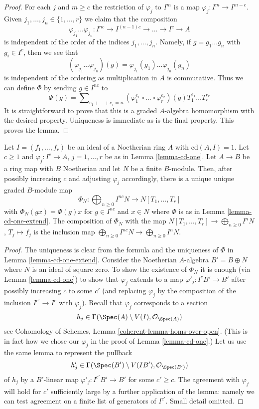 \begin{proof}
For each $j$ and $m \geq c$ the restriction of $\varphi_j$ to
$I^m$ is a map $\varphi_j : I^m \to I^{m - c}$.
Given $j_1, \ldots, j_n \in \{1, \ldots, r\}$ we claim that the
composition
$$
\varphi_{j_1} \ldots \varphi_{j_n} :
I^{nc} \to I^{(n - 1)c} \to \ldots \to I^c \to A
$$
is independent of the order of the indices $j_1, \ldots, j_n$.
Namely, if $g = g_1 \ldots g_n$ with $g_i \in I^c$, then
we see that
$$
(\varphi_{j_1} \ldots \varphi_{j_n})(g) =
\varphi_{j_1}(g_1) \ldots \varphi_{j_n}(g_n)
$$
is independent of the ordering as multiplication in $A$ is commutative.
Thus we can define $\Phi$ by sending $g \in I^{nc}$ to
$$
\Phi(g) = \sum\nolimits_{e_1 + \ldots + e_r = n}
(\varphi_1^{e_1} \circ \ldots \circ \varphi_r^{e_r})(g)
T_1^{e_1} \ldots T_r^{e_r}
$$
It is straightforward to prove that this is a graded $A$-algebra
homomorphism with the desired property. Uniqueness is immediate
as is the final property. This proves the lemma.
\end{proof}

\begin{lemma}
\label{lemma-cd-one-extend-to-module}
Let $I = (f_1, \ldots, f_r)$ be an ideal of a Noetherian ring $A$
with $\text{cd}(A, I) = 1$. Let $c \geq 1$ and $\varphi_j : I^c \to A$,
$j = 1, \ldots, r$ be as in Lemma \ref{lemma-cd-one}.
Let $A \to B$ be a ring map with $B$ Noetherian and let $N$ be
a finite $B$-module. Then, after possibly increasing $c$
and adjusting $\varphi_j$ accordingly, there is a unique
unique graded $B$-module map
$$
\Phi_N : \bigoplus\nolimits_{n \geq 0} I^{nc}N \to N[T_1, \ldots, T_r]
$$
with $\Phi_N(g x) = \Phi(g) x$ for $g \in I^{nc}$ and $x \in N$
where $\Phi$ is as in Lemma \ref{lemma-cd-one-extend}.
The composition of $\Phi_N$ with the map
$N[T_1, \ldots, T_r] \to \bigoplus_{n \geq 0} I^nN$,
$T_j \mapsto f_j$ is the inclusion map
$\bigoplus_{n \geq 0} I^{nc}N \to \bigoplus_{n \geq 0} I^nN$.
\end{lemma}

\begin{proof}
The uniqueness is clear from the formula and the uniqueness of $\Phi$ in
Lemma \ref{lemma-cd-one-extend}. Consider the Noetherian $A$-algebra
$B' = B \oplus N$ where $N$ is an ideal of square zero. To show
the existence of $\Phi_N$ it is enough
(via Lemma \ref{lemma-cd-one}) to show that $\varphi_j$ extends to
a map $\varphi'_j : I^cB' \to B'$ after possibly increasing $c$
to some $c'$ (and replacing $\varphi_j$ by the composition of the inclusion
$I^{c'} \to I^c$ with $\varphi_j$). Recall that $\varphi_j$ corresponds to a
section
$$
h_j \in \Gamma(\Spec(A) \setminus V(I), \mathcal{O}_{\Spec(A)})
$$
see Cohomology of Schemes, Lemma \ref{coherent-lemma-homs-over-open}.
(This is in fact how we chose our $\varphi_j$ in the proof of
Lemma \ref{lemma-cd-one}.) Let us use the same lemma to represent the pullback
$$
h'_j \in \Gamma(\Spec(B') \setminus V(IB'), \mathcal{O}_{\Spec(B')})
$$
of $h_j$ by a $B'$-linear map
$\varphi'_j : I^{c'}B' \to B'$ for some $c' \geq c$.
The agreement with $\varphi_j$ will hold for $c'$
sufficiently large by a further application of the lemma:
namely we can test agreement on a finite list of generators of $I^{c'}$.
Small detail omitted.
\end{proof}

